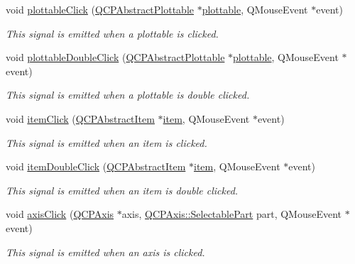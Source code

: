 \begin{DoxyCompactItemize}
void \hyperlink{classQCustomPlot_a57e5efa8a854620e9bf62d31fc139f53}{plottable\+Click} (\hyperlink{classQCPAbstractPlottable}{Q\+C\+P\+Abstract\+Plottable} $\ast$\hyperlink{classQCustomPlot_a32de81ff53e263e785b83b52ecd99d6f}{plottable}, Q\+Mouse\+Event $\ast$event)
\begin{DoxyCompactList}\small\item\em This signal is emitted when a plottable is clicked. \end{DoxyCompactList}\item 
void \hyperlink{classQCustomPlot_af2e6f1cea923dae437681d01ce7d0c31}{plottable\+Double\+Click} (\hyperlink{classQCPAbstractPlottable}{Q\+C\+P\+Abstract\+Plottable} $\ast$\hyperlink{classQCustomPlot_a32de81ff53e263e785b83b52ecd99d6f}{plottable}, Q\+Mouse\+Event $\ast$event)
\begin{DoxyCompactList}\small\item\em This signal is emitted when a plottable is double clicked. \end{DoxyCompactList}\item 
void \hyperlink{classQCustomPlot_ae16b51f52d2b7aebbc7e3e74e6ff2e4b}{item\+Click} (\hyperlink{classQCPAbstractItem}{Q\+C\+P\+Abstract\+Item} $\ast$\hyperlink{classQCustomPlot_a3e842b5a65b1d17fbb96cfb1fa1314d1}{item}, Q\+Mouse\+Event $\ast$event)
\begin{DoxyCompactList}\small\item\em This signal is emitted when an item is clicked. \end{DoxyCompactList}\item 
void \hyperlink{classQCustomPlot_ac83aa9f5a3e9bb3efc9cdc763dcd42a6}{item\+Double\+Click} (\hyperlink{classQCPAbstractItem}{Q\+C\+P\+Abstract\+Item} $\ast$\hyperlink{classQCustomPlot_a3e842b5a65b1d17fbb96cfb1fa1314d1}{item}, Q\+Mouse\+Event $\ast$event)
\begin{DoxyCompactList}\small\item\em This signal is emitted when an item is double clicked. \end{DoxyCompactList}\item 
void \hyperlink{classQCustomPlot_abf635f8b56ab5c16d5de9f358543e82b}{axis\+Click} (\hyperlink{classQCPAxis}{Q\+C\+P\+Axis} $\ast$axis, \hyperlink{classQCPAxis_abee4c7a54c468b1385dfce2c898b115f}{Q\+C\+P\+Axis\+::\+Selectable\+Part} part, Q\+Mouse\+Event $\ast$event)
\begin{DoxyCompactList}\small\item\em This signal is emitted when an axis is clicked. \end{DoxyCompactList}\item 

\end{DoxyCompactItemize}
